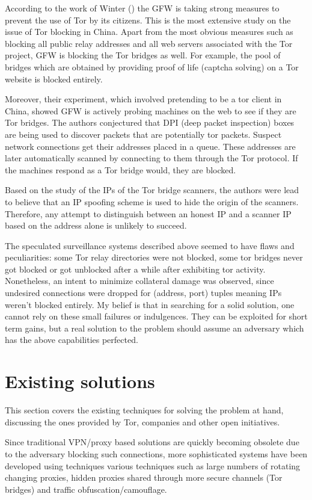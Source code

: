 \documentclass[11pt]{book} %
\begin{document}
According to the work of Winter (\citep*{winterInChina}) the GFW is taking strong measures to prevent the use of Tor by its citizens. This is the most extensive study on the issue of Tor blocking in China. Apart from the most obvious measures such as blocking all public relay addresses and all web servers associated with the Tor project, GFW is blocking the Tor bridges as well. For example, the pool of bridges which are obtained by providing proof of life (captcha solving) on a Tor website is blocked entirely. 

Moreover, their experiment, which involved pretending to be a tor client in China, showed GFW is actively probing machines on the web to see if they are Tor bridges. The authors conjectured that DPI (deep packet inspection) boxes are being used to discover packets that are potentially tor packets. Suspect network connections get their addresses placed in a queue. These addresses are later automatically scanned by connecting to them through the Tor protocol. If the machines respond as a Tor bridge would, they are blocked.

Based on the study of the IPs of the Tor bridge scanners, the authors were lead to believe that an IP spoofing scheme is used to hide the origin of the scanners. Therefore, any attempt to distinguish between an honest IP and a scanner IP based on the address alone is unlikely to succeed. 

The speculated surveillance systems described above seemed to have flaws and peculiarities: some Tor relay directories were not blocked, some tor bridges never got blocked or got unblocked after a while after exhibiting tor activity. Nonetheless, an intent to minimize collateral damage was observed, since undesired connections were dropped for (address, port) tuples meaning IPs weren’t blocked entirely.  My belief is that in searching for a solid solution, one cannot rely on these small failures or indulgences. They can be exploited for short term gains, but a real solution to the problem should assume an adversary which has the above capabilities perfected.

\section{Existing solutions}

This section covers the existing techniques for solving the problem at hand, discussing the ones provided by Tor, companies and other open initiatives.
 
Since traditional VPN/proxy based solutions are quickly becoming obsolete due to the adversary blocking such connections, more sophisticated systems have been developed using techniques various techniques such as large numbers of rotating changing proxies, hidden proxies shared through more secure channels (Tor bridges) and traffic obfuscation/camouflage.
\end{document}
